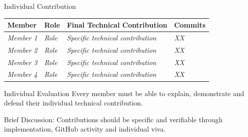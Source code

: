 \documentclass[aspectratio=169,11pt]{beamer}
\newcommand{\smallnote}[1]{%
\vspace{0.08cm}
{\scriptsize\color{GEUGrey}#1}
}
\newcommand{\placeholder}[1]{%
\textit{\color{GEUGrey}#1}
}
\begin{document}
\begin{frame}{Individual Contribution}

\scriptsize

\begin{center}

\renewcommand{\arraystretch}{1.35}

\begin{tabularx}{.96\textwidth}
{@{}p{1.8cm}p{1.8cm}X p{1.5cm}@{}}

\toprule
Member &
Role &
Final Technical Contribution &
Commits\\
\midrule

\placeholder{Member 1} &
\placeholder{Role} &
\placeholder{Specific technical contribution} &
\placeholder{XX}\\

\placeholder{Member 2} &
\placeholder{Role} &
\placeholder{Specific technical contribution} &
\placeholder{XX}\\

\placeholder{Member 3} &
\placeholder{Role} &
\placeholder{Specific technical contribution} &
\placeholder{XX}\\

\placeholder{Member 4} &
\placeholder{Role} &
\placeholder{Specific technical contribution} &
\placeholder{XX}\\

\bottomrule

\end{tabularx}

\end{center}

\vspace{3mm}

\begin{block}{Individual Evaluation}
Every member must be able to explain, demonstrate and defend
their individual technical contribution.
\end{block}

\smallnote{
Brief Discussion: Contributions should be specific and verifiable
through implementation, GitHub activity and individual viva.
}

\end{frame}
\end{document}
